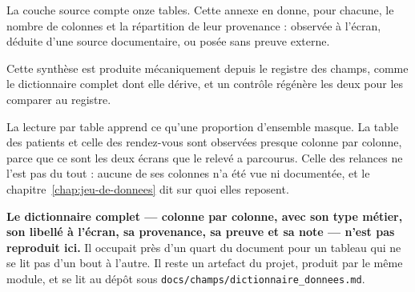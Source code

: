 \appendix

\label{annexe:dictionnaire}

La couche source compte onze tables. Cette annexe en donne, pour chacune, le nombre de colonnes et
la répartition de leur provenance : observée à l'écran, déduite d'une source documentaire, ou posée
sans preuve externe.

Cette synthèse est produite mécaniquement depuis le registre des champs, comme le dictionnaire
complet dont elle dérive, et un contrôle régénère les deux pour les comparer au registre.



\medskip

La lecture par table apprend ce qu'une proportion d'ensemble masque. La table des patients et
celle des rendez-vous sont observées presque colonne par colonne, parce que ce sont les deux
écrans que le relevé a parcourus. Celle des relances ne l'est pas du tout : aucune de ses colonnes
n'a été vue ni documentée, et le chapitre~\ref{chap:jeu-de-donnees} dit sur quoi elles reposent.

\textbf{Le dictionnaire complet — colonne par colonne, avec son type métier, son libellé à
l'écran, sa provenance, sa preuve et sa note — n'est pas reproduit ici.} Il occupait près d'un
quart du document pour un tableau qui ne se lit pas d'un bout à l'autre. Il reste un artefact du
projet, produit par le même module, et se lit au dépôt sous
\texttt{docs/champs/dictionnaire\_donnees.md}.






